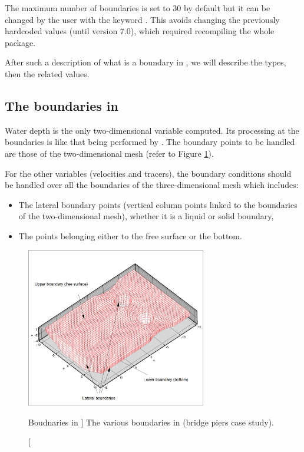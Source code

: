 The maximum number of boundaries is set to 30 by default but it can be changed
by the user with the keyword .
This avoids changing the previously hardcoded values (until version 7.0),
which required recompiling the whole package.

After such a description of what is a boundary in , we will describe
the types, then the related values.

\subsection{The boundaries in }

Water depth is the only two-dimensional variable computed. Its processing at
the boundaries is like that being performed by . The boundary points
to be handled are those of the two-dimensional mesh (refer to Figure
\ref{fig:bnd}).

For the other variables (velocities and tracers), the boundary conditions
should be handled over all the boundaries of the three-dimensional mesh which
includes:

\begin{itemize}
\item The lateral boundary points (vertical column points linked to the
boundaries of the two-dimensional mesh), whether it is a liquid or solid
boundary,

\item The points belonging either to the free surface or the bottom.
\end{itemize}

\begin{figure}[H]%
\begin{center}
%
  \includegraphics[width=0.7\textwidth]{./graphics/bnd}
%
\end{center}
\caption
[Boudnaries in ]
{The various boundaries in  (bridge piers case study).}
\label{fig:bnd}
\end{figure}

